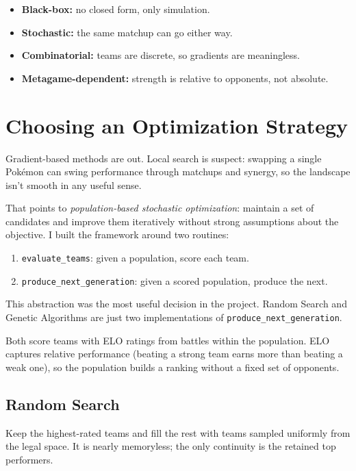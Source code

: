 \documentclass{article}
\begin{document}
\begin{itemize}
\item \textbf{Black-box:} no closed form, only simulation.
\item \textbf{Stochastic:} the same matchup can go either way.
\item \textbf{Combinatorial:} teams are discrete, so gradients are meaningless.
\item \textbf{Metagame-dependent:} strength is relative to opponents, not absolute.
\end{itemize}

\section{Choosing an Optimization Strategy}

Gradient-based methods are out. Local search is suspect: swapping a single Pokémon can swing performance through matchups and synergy, so the landscape isn't smooth in any useful sense.

That points to \emph{population-based stochastic optimization}: maintain a set of candidates and improve them iteratively without strong assumptions about the objective. I built the framework around two routines:

\begin{enumerate}
\item \texttt{evaluate\_teams}: given a population, score each team.
\item \texttt{produce\_next\_generation}: given a scored population, produce the next.
\end{enumerate}

This abstraction was the most useful decision in the project. Random Search and Genetic Algorithms are just two implementations of \texttt{produce\_next\_generation}.

Both score teams with ELO ratings from battles within the population. ELO captures relative performance (beating a strong team earns more than beating a weak one), so the population builds a ranking without a fixed set of opponents.

\subsection{Random Search}

Keep the highest-rated teams and fill the rest with teams sampled uniformly from the legal space. It is nearly memoryless; the only continuity is the retained top performers.
\end{document}
